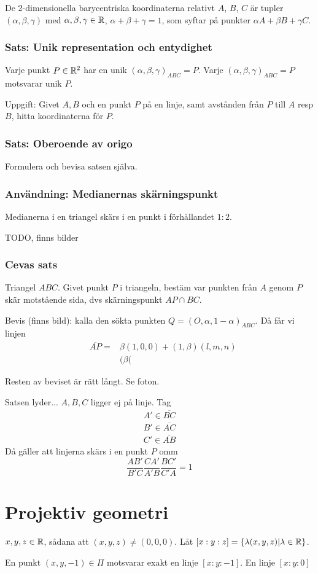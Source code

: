 \documentclass[10pt,a4paper]{article}
\begin{document}
De 2-dimensionella barycentriska koordinaterna relativt $A$, $B$, $C$ är tupler $(\alpha, \beta, \gamma)$ med $\alpha, \beta, \gamma \in \mathbb{R}$, $\alpha + \beta + \gamma = 1$, som syftar på punkter $\alpha A + \beta B + \gamma C$.

\subsubsection{Sats: Unik representation och entydighet}
Varje punkt $P \in \mathbb{R}^2$ har en unik $(\alpha, \beta, \gamma)_{ABC} = P$. Varje $(\alpha,\beta,\gamma)_{ABC} = P$ motsvarar unik $P$.

Uppgift: Givet $A,B$ och en punkt $P$ på en linje, samt avstånden från $P$ till $A$ resp $B$, hitta koordinaterna för $P$.


\subsubsection{Sats: Oberoende av origo}
Formulera och bevisa satsen själva.

\subsubsection{Användning: Medianernas skärningspunkt}
Medianerna i en triangel skärs i en punkt i förhållandet $1:2$.

TODO, finns bilder

\subsubsection{Cevas sats}
Triangel $ABC$. Givet punkt $P$ i triangeln, bestäm var punkten från $A$ genom $P$ skär motstående sida, dvs skärningspunkt $AP \cap BC$.

Bevis (finns bild): kalla den sökta punkten $Q = (O, \alpha, 1-\alpha)_{ABC}$. Då får vi linjen 
\begin{eqnarray*}
& \overline{AP} =& \beta (1, 0, 0) + (1, \beta)(l,m,n) \\
&& (\beta (
\end{eqnarray*}

Resten av beviset är rätt långt. Se foton.

Satsen lyder...
$A,B,C$ ligger ej på linje. Tag 
\begin{eqnarray*}
A' \in \overline{BC} \\
B' \in \overline{AC} \\
C' \in \overline{AB}
\end{eqnarray*}
Då gäller att linjerna skärs i en punkt $P$ omm
\[ \frac{AB'}{B'C} \frac{CA'}{A'B} \frac{BC'}{C'A} = 1 \]


\section{Projektiv geometri}
$x,y,z \in \mathbb{R}$, sådana att $(x,y,z) \neq (0,0,0)$.
Låt $[ x : y : z ] = \{ \lambda (x,y,z) | \lambda \in \mathbb{R} \}$.


En punkt $(x,y,-1) \in \Pi$ motsvarar exakt en linje $[ x : y : -1]$. En linje $[x:y:0]$
\end{document}
